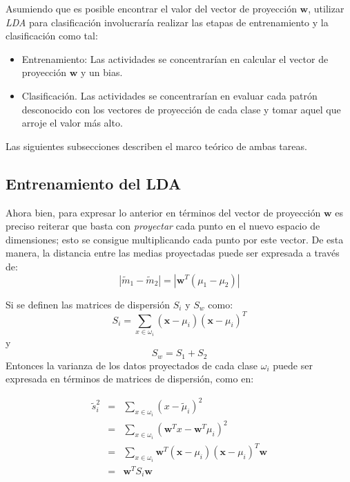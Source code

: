 \documentclass[journal]{IEEEtran}
\begin{document}
Asumiendo que es posible encontrar el valor del vector de proyección $\mathbf{w}$, utilizar \emph{LDA} para clasificación involucraría realizar las etapas de entrenamiento y la clasificación como tal:
\begin{itemize}
	\item Entrenamiento: Las actividades se concentrarían en calcular el vector de proyección $\mathbf{w}$ y un bias.
	\item Clasificación. Las actividades se concentrarían en evaluar cada patrón desconocido con los vectores de proyección de cada clase y tomar aquel que arroje el valor más alto.
\end{itemize}

Las siguientes subsecciones describen el marco teórico de ambas tareas.

\subsection{Entrenamiento del LDA} %
\label{sub:entrenamiento_del_lda}

Ahora bien, para expresar lo anterior en términos del vector de proyección $\mathbf{w}$ es preciso reiterar que basta con \emph{proyectar} cada punto en el nuevo espacio de dimensiones; esto se consigue multiplicando cada punto por este vector.
De esta manera, la distancia entre las medias proyectadas puede ser expresada a través de:
\begin{equation}
|\tilde{m}_1 - \tilde{m}_2| = |\mathbf{w}^T (\mu_1 - \mu_2)|
\end{equation}

Si se definen las matrices de dispersión $S_i$ y $S_w$ como:
\begin{equation}
S_i = \sum_{x\in\omega_i}(\mathbf{x}-\mu_i)(\mathbf{x} - \mu_i)^T
\end{equation}
y
\begin{equation}
S_w = S_1 + S_2
\end{equation}
Entonces la varianza de los datos proyectados de cada clase $\omega_i$ puede ser expresada en términos de matrices de dispersión, como en:

\begin{eqnarray}
\tilde{s}_i^2 &=& \sum_{x\in\omega_i}{(x-\tilde{\mu}_i)^2} \label{eq:varianzas} \\ 
&=& \sum_{x\in\omega_i}{(\mathbf{w}^Tx-\mathbf{w}^T\mu_i)^2} \\
&=& \sum_{x\in\omega_i}{\mathbf{w}^T(\mathbf{x}-\mu_i)(\mathbf{x} - \mu_i)^T\mathbf{w}} \\
&=& \mathbf{w}^TS_i\mathbf{w}
\end{eqnarray}
\end{document}

